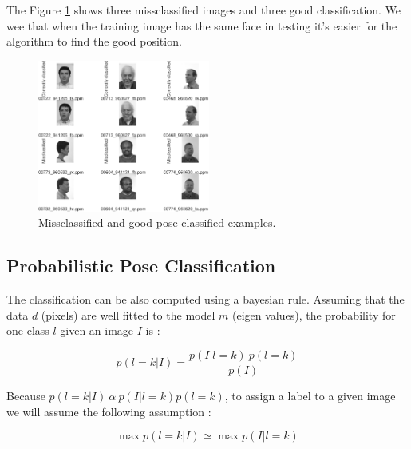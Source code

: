 \documentclass[runningheads,a4paper]{llncs}
\begin{document}
The Figure \ref{fig:error_class_pose_eig} shows three missclassified images and three good classification. We wee that when the training image has the same face in testing it's easier for the algorithm to find the good position.

\begin{figure}
\centering
\includegraphics[height=5cm]{Figures/error_class_pose_eig}
\caption{Missclassified and good pose classified examples.}
\label{fig:error_class_pose_eig}
\end{figure}

\subsection{Probabilistic Pose Classification}

The classification can be also computed using a bayesian rule. Assuming that the data $d$ (pixels) are well fitted to the model $m$ (eigen values), the probability for one class $l$ given an image $I$ is :

\begin{equation}
p(l=k|I)=\frac{p(I|l=k)~p(l=k)}{p(I)}
\end{equation}

Because $p(l=k|I) ~\alpha~p(I|l=k)p(l=k)$, to assign a label to a given image we will assume the following assumption :

\begin{equation}
\max p(l=k|I) \simeq \max p(I|l=k)
\end{equation}
\end{document}
